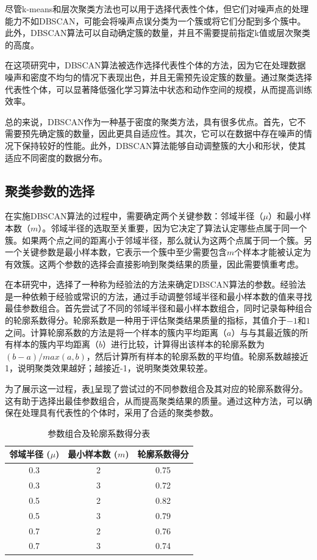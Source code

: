 尽管k-means和层次聚类方法也可以用于选择代表性个体，但它们对噪声点的处理能力不如DBSCAN，可能会将噪声点误分类为一个簇或将它们分配到多个簇中。此外，DBSCAN算法可以自动确定簇的数量，并且不需要提前指定k值或层次聚类的高度。

在这项研究中，DBSCAN算法被选作选择代表性个体的方法，因为它在处理数据噪声和密度不均匀的情况下表现出色，并且无需预先设定簇的数量。通过聚类选择代表性个体，可以显著降低强化学习算法中状态和动作空间的规模，从而提高训练效率。

总的来说，DBSCAN作为一种基于密度的聚类方法，具有很多优点。首先，它不需要预先确定簇的数量，因此更具自适应性。其次，它可以在数据中存在噪声的情况下保持较好的性能。此外，DBSCAN算法能够自动调整簇的大小和形状，使其适应不同密度的数据分布。

\subsection{聚类参数的选择}
在实施DBSCAN算法的过程中，需要确定两个关键参数：邻域半径（$\mu$）和最小样本数（$m$）。邻域半径的选取至关重要，因为它决定了算法认定哪些点属于同一个簇。如果两个点之间的距离小于邻域半径，那么就认为这两个点属于同一个簇。另一个关键参数是最小样本数，它表示一个簇中至少需要包含$m$个样本才能被认定为有效簇。这两个参数的选择会直接影响到聚类结果的质量，因此需要慎重考虑。

在本研究中，选择了一种称为经验法的方法来确定DBSCAN算法的参数。经验法是一种依赖于经验或常识的方法，通过手动调整邻域半径和最小样本数的值来寻找最佳参数组合。首先尝试了不同的邻域半径和最小样本数组合，同时记录每种组合的轮廓系数得分。轮廓系数是一种用于评估聚类结果质量的指标，其值介于$-1$和$1$之间。计算轮廓系数的方法是将一个样本的簇内平均距离（$a$）与与其最近簇的所有样本的簇内平均距离（$b$）进行比较，计算得出该样本的轮廓系数为${(b-a)} / {max(a,b)}$，然后计算所有样本的轮廓系数的平均值。轮廓系数越接近1，说明聚类效果越好；越接近-1，说明聚类效果较差。

为了展示这一过程，表\ref{tab_cluster}呈现了尝试过的不同参数组合及其对应的轮廓系数得分。这有助于选择出最佳参数组合，从而提高聚类结果的质量。通过这种方法，可以确保在处理具有代表性的个体时，采用了合适的聚类参数。

\renewcommand{\arraystretch}{1.2} %
\setlength{\tabcolsep}{8mm}
\begin{table}[htbp]
\centering
\caption{参数组合及轮廓系数得分表}
\label{tab_cluster}
\begin{tabular}{ccc}
\toprule
邻域半径 ($\mu$) & 最小样本数 ($m$) & 轮廓系数得分       \\
\midrule
0.3 & 2 & 0.75 \\ 
0.3 & 3 & 0.72 \\ 
0.5 & 2 & 0.82 \\ 
0.5 & 3 & 0.79 \\ 
0.7 & 2 & 0.76 \\ 
0.7 & 3 & 0.74 \\ 

\bottomrule
\end{tabular}
\end{table}

